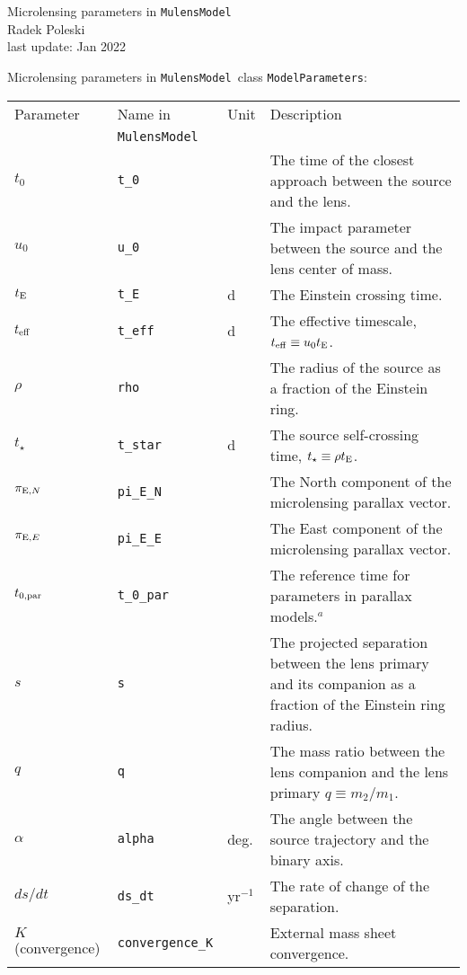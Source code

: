 \documentclass[12pt]{article}
\newcommand\MM{{\tt MulensModel}}
\begin{document}

\begin{center}
{\LARGE Microlensing parameters in \MM}\\
\bigskip
Radek Poleski\\
last update: Jan 2022
\end{center}

\bigskip
Microlensing parameters in \MM\, class {\tt ModelParameters}:

\begin{table*}[!h]
\begin{tabular}{l l l p{10cm}}
Parameter & Name in &  Unit & Description \\
 & \MM &  & \\
\hline
$t_0$ & {\tt t\_0} & & The time of the closest approach between the source and the lens. \\
$u_0$ & {\tt u\_0} & & The impact parameter between the source and the lens center of mass. \\
$t_{\rm E}$ & {\tt t\_E} & d & The Einstein crossing time. \\
$t_{\rm eff}$ & {\tt t\_eff} & d & The effective timescale, $t_{\rm eff} \equiv u_0 t_{\rm E}$. \\
$\rho$ & {\tt rho} & & The radius of the source as a fraction of the Einstein ring. \\
$t_{\star}$ & {\tt t\_star} & d & The source self-crossing time, $t_\star \equiv \rho t_{\rm E}$. \\
$\pi_{{\rm E}, N}$ & {\tt pi\_E\_N} & & The North component of the microlensing parallax vector. \\
$\pi_{{\rm E}, E}$ & {\tt pi\_E\_E} & & The East component of the microlensing parallax vector. \\
$t_{0,{\rm par}}$ & {\tt t\_0\_par} & & The reference time for parameters in parallax models.$^a$ \\
$s$ & {\tt s} & & The projected separation between the lens primary and its companion as a fraction of the Einstein ring radius. \\
$q$ & {\tt q} & & The mass ratio between the lens companion and the lens primary $q \equiv m_2/m_1$. \\
$\alpha$ & {\tt alpha} & deg. & The angle between the source trajectory and the binary axis. \\
$ds/dt$ & {\tt ds\_dt} & yr$^{-1}$ & The rate of change of the separation. \\
$K$ (convergence) & {\tt convergence\_K} & & External mass sheet convergence. \\

\end{tabular}
\end{table*}
\end{document}
